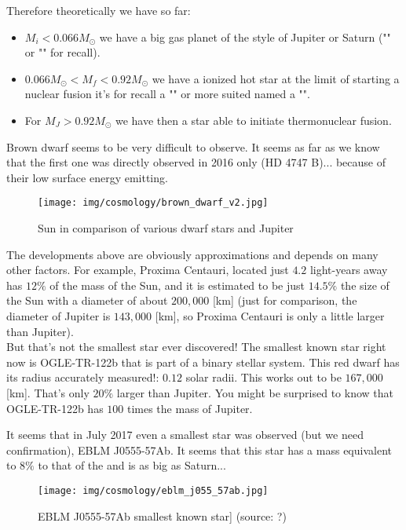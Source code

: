 	Therefore theoretically we have so far:
	\begin{itemize}
		\item $M_i<0.066M_\odot$ we have a big gas planet of the style of Jupiter or Saturn ("" or "" for recall).

		\item $0.066M_\odot<M_f<0.92M_\odot$ we have a ionized hot star at the limit of starting a nuclear fusion it's for recall a "" or more suited named a "".

		\item For $M_J>0.92M_\odot$ we have then a star able to initiate thermonuclear fusion.
	\end{itemize}
	Brown dwarf seems to be very difficult to observe. It seems as far as we know that the first one was directly observed in 2016 only (HD 4747 B)... because of their low surface energy emitting.
	\begin{figure}[H]
		\centering
		\texttt{[image: img/cosmology/brown\_dwarf\_v2.jpg]}	
		\caption{Sun in comparison of various dwarf stars and Jupiter}
	\end{figure}
	The developments above are obviously approximations and depends on many other factors. For example, Proxima Centauri, located just $4.2$ light-years away has $12\%$ of the mass of the Sun, and it is estimated to be just $14.5\%$ the size of the Sun with a diameter of  about $200,000$ [km] (just for comparison, the diameter of Jupiter is $143,000$ [km], so Proxima Centauri is only a little larger than Jupiter).\\

	But that's not the smallest star ever discovered! The smallest known star right now is OGLE-TR-122b that is part of a binary stellar system. This red dwarf has its radius accurately measured!: $0.12$ solar radii. This works out to be $167,000$ [km]. That's only $20\%$ larger than Jupiter. You might be surprised to know that OGLE-TR-122b has $100$ times the mass of Jupiter.
	
	It seems that in July 2017 even a smallest star was observed (but we need confirmation), EBLM J0555-57Ab. It seems that this star has a mass equivalent to $8\%$ to that of the and is as big as Saturn...
	\begin{figure}[H]
		\centering
		\texttt{[image: img/cosmology/eblm\_j055\_57ab.jpg]}	
		\caption[EBLM J0555-57Ab smallest known star]{EBLM J0555-57Ab smallest known star] (source: ?)}
	\end{figure}
	
